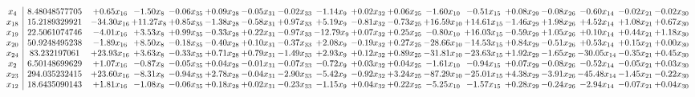 \documentclass[9pt]{article}
\begin{document}
 \[\begin{array}{c| c c@{\hskip 2pt} c@{\hskip 2pt} c@{\hskip 2pt} c@{\hskip 2pt} c@{\hskip 2pt} c@{\hskip 2pt} c@{\hskip 2pt} c@{\hskip 2pt} c@{\hskip 2pt} c@{\hskip 2pt} c@{\hskip 2pt} c@{\hskip 2pt} c@{\hskip 2pt} c@{\hskip 2pt} c@{\hskip 2pt} c@{\hskip 2pt} }
 x_{4}   &  8.48048577705 & +  0.65 x_{16} & -1.50 x_{8} & -0.06 x_{35} & +  0.09 x_{28} & -0.05 x_{31} & -0.02 x_{33} & -1.14 x_{9} & +  0.02 x_{32} & +  0.06 x_{25} & -1.60 x_{10} & -0.51 x_{15} & +  0.08 x_{29} & -0.08 x_{26} & -0.60 x_{14} & -0.02 x_{21} & -0.02 x_{30}\\
 x_{18}   &  15.2189329921 & -34.30 x_{16} & + 11.27 x_{8} & +  0.85 x_{35} & -1.38 x_{28} & -0.58 x_{31} & +  0.97 x_{33} & +  5.19 x_{9} & -0.81 x_{32} & -0.73 x_{25} & + 16.59 x_{10} & + 14.61 x_{15} & -1.46 x_{29} & +  1.98 x_{26} & +  4.52 x_{14} & +  1.08 x_{21} & +  0.67 x_{30}\\
 x_{19}   &  22.5061074746 & -4.01 x_{16} & +  3.53 x_{8} & +  0.99 x_{35} & -0.33 x_{28} & +  0.22 x_{31} & -0.97 x_{33} & -12.79 x_{9} & +  0.07 x_{32} & +  0.25 x_{25} & -0.80 x_{10} & + 16.03 x_{15} & -0.59 x_{29} & +  1.05 x_{26} & +  0.10 x_{14} & +  0.44 x_{21} & +  1.18 x_{30}\\
 x_{20}   &  50.9248495238 & -1.89 x_{16} & +  8.50 x_{8} & -0.18 x_{35} & -0.40 x_{28} & +  0.10 x_{31} & -0.37 x_{33} & +  2.08 x_{9} & -0.19 x_{32} & +  0.27 x_{25} & -28.66 x_{10} & -14.53 x_{15} & +  0.84 x_{29} & -0.51 x_{26} & +  0.53 x_{14} & +  0.15 x_{21} & +  0.00 x_{30}\\
 x_{24}   &  83.232197061 & + 23.93 x_{16} & +  3.63 x_{8} & -0.33 x_{35} & +  0.71 x_{28} & +  0.79 x_{31} & -1.49 x_{33} & +  2.93 x_{9} & +  0.12 x_{32} & +  0.89 x_{25} & -31.81 x_{10} & -23.63 x_{15} & +  1.92 x_{29} & -1.65 x_{26} & -30.05 x_{14} & -0.35 x_{21} & +  0.45 x_{30}\\
 x_{2}   &  6.50148699629 & +  1.07 x_{16} & -0.87 x_{8} & -0.05 x_{35} & +  0.04 x_{28} & -0.01 x_{31} & -0.07 x_{33} & -0.72 x_{9} & +  0.03 x_{32} & +  0.04 x_{25} & -1.61 x_{10} & -0.94 x_{15} & +  0.07 x_{29} & -0.08 x_{26} & -0.52 x_{14} & -0.05 x_{21} & +  0.03 x_{30}\\
 x_{23}   &  294.035232415 & + 23.60 x_{16} & -8.31 x_{8} & -0.94 x_{35} & +  2.78 x_{28} & -0.04 x_{31} & -2.90 x_{33} & -5.42 x_{9} & -0.92 x_{32} & +  3.24 x_{25} & -87.29 x_{10} & -25.01 x_{15} & +  4.38 x_{29} & -3.91 x_{26} & -45.48 x_{14} & -1.45 x_{21} & -0.22 x_{30}\\
 x_{12}   &  18.6435090143 & +  1.81 x_{16} & -1.08 x_{8} & -0.06 x_{35} & +  0.18 x_{28} & +  0.02 x_{31} & -0.23 x_{33} & -1.15 x_{9} & +  0.04 x_{32} & +  0.22 x_{25} & -5.25 x_{10} & -1.57 x_{15} & +  0.28 x_{29} & -0.24 x_{26} & -2.94 x_{14} & -0.07 x_{21} & +  0.04 x_{30}\\

\end{array}\]
\end{document}
